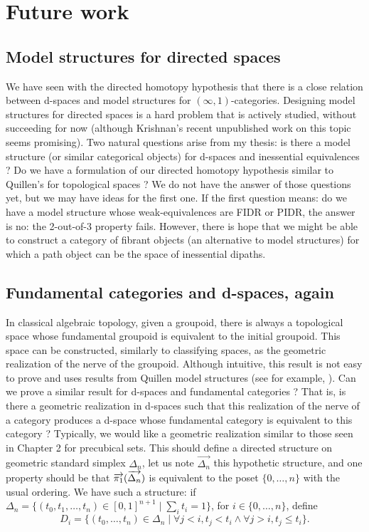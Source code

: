 \section*{Future work}

\subsection*{Model structures for directed spaces}

We have seen with the directed homotopy hypothesis that there is a close relation between d-spaces and model structures for $(\infty,1)$-categories. Designing model structures for directed spaces is a hard problem that is actively studied, without succeeding for now (although Krishnan's recent unpublished work on this topic seems promising). Two natural questions arise from my thesis: is there a model structure (or similar categorical objects) for d-spaces and inessential equivalences ? Do we have a formulation of our directed homotopy hypothesis similar to Quillen's for topological spaces ? We do not have the answer of those questions yet, but we may have ideas for the first one. If the first question means: do we have a model structure whose weak-equivalences are FIDR or PIDR, the answer is no: the 2-out-of-3 property fails. However, there is hope that we might be able to construct a category of fibrant objects (an alternative to model structures) for which a path object can be the space of inessential dipaths. 


\subsection*{Fundamental categories and d-spaces, again}

In classical algebraic topology, given a groupoid, there is always a topological space whose fundamental groupoid is equivalent to the initial groupoid. This space can be constructed, similarly to classifying spaces, as the geometric realization of the nerve of the groupoid. Although intuitive, this result is not easy to prove and uses results from Quillen model structures (see for example, \cite{joyal08b}). Can we prove a similar result for d-spaces and fundamental categories ? That is, is there a geometric realization in d-spaces such that this realization of the nerve of a category produces a d-space whose fundamental category is equivalent to this category ? Typically, we would like a geometric realization similar to those seen in Chapter 2 for precubical sets. This should define a directed structure on geometric standard simplex $\Delta_n$, let us note $\overrightarrow{\Delta_n}$ this hypothetic structure, and one property should be that $\overrightarrow{\pi_1}(\overrightarrow{\Delta_n})$ is equivalent to the poset $\{0, \ldots, n\}$ with the usual ordering. We have such a structure: if $\Delta_n = \{(t_0, t_1, \ldots, t_n) \in [0, 1]^{n+1} \mid \sum_i t_i = 1\}$, for $i \in \{0, \ldots, n\}$, define 
$$D_i = \{(t_0, \ldots, t_n) \in \Delta_n \mid \forall j < i, t_j < t_i \wedge \forall j > i, t_j \leq t_i\}.$$


